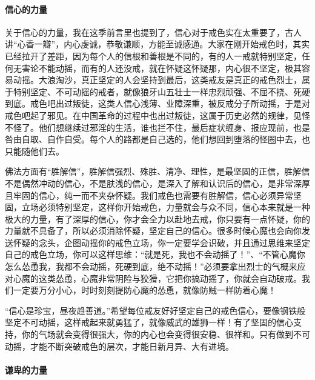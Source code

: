 \paragraph{信心的力量}

关于信心的力量，我在这季前言里也提到了，信心对于戒色实在太重要了，古人讲“心香一瓣”，内心虔诚，恭敬谦顺，方能至诚感通。大家在刚开始戒色时，其实已经拉开了差距，因为每个人的信根和善根是不同的，有的人一戒就特别坚定，任何无害论不能动摇，而有的人还没戒，就在怀疑这怀疑那，内心很不坚定，极其容易动摇。大浪淘沙，真正坚定的人会坚持到最后，这类戒友是真正的戒色烈士，属于特别坚定、不可动摇的戒者，就像狼牙山五壮士一样忠烈顽强、不屈不挠、死硬到底。戒色吧出过叛徒，这类人信心浅薄、业障深重，被反戒分子所动摇，于是对戒色吧起了邪见。在中国革命的过程中也出过叛徒，这属于历史必然的规律，见怪不怪了。他们想继续过邪淫的生活，谁也拦不住，最后症状缠身、报应现前，也是咎由自取、自作自受。每个人的路都是自己选的，他们想回到堕落的怪圈中去，也只能随他们去。

佛法方面有“胜解信”，胜解信强烈、殊胜、清净、理性，是最坚固的正信，胜解信不是偶然冲动的信心，不是肤浅的信心，是深入了解和认识后的信心，是非常深厚且牢固的信心，纯一而不夹杂怀疑。我们戒色也需要有胜解信，信心必须异常坚固，立场必须特别坚定，这样你开始戒色，力量就会与众不同，信心本来就是一种极大的力量，有了深厚的信心，你才会全力以赴地去戒，你只要有一点怀疑，你的力量就不具备了，所以必须消除怀疑，坚定自己的信心。很多时候心魔也会向你发送怀疑的念头，企图动摇你的戒色立场，你一定要学会识破，并且通过思维来坚定自己的戒色立场，你可以这样思维：“就是死，我也不会动摇了！”、“不管心魔你怎么怂恿我，我都不会动摇，死硬到底，绝不动摇！”必须要拿出烈士的气概来应对心魔的这类怂恿，心魔非常阴险与狡猾，它把你搞动摇了，你就会自动破戒。我们一定要万分小心，时时刻刻提防心魔的怂恿，就像防贼一样防着心魔！

“信心是珍宝，昼夜趋善道。”希望每位戒友好好坚定自己的戒色信心，要像钢铁般坚定不可动摇，这样戒起来就勇猛了，就像威武的雄狮一样！有了坚固的信心支持，你的气场就会变得很强大，你的内心也会变得很安稳、很祥和。只有做到不可动摇，才能不断突破戒色的层次，才能日新月异、大有进境。

\paragraph{谦卑的力量}

